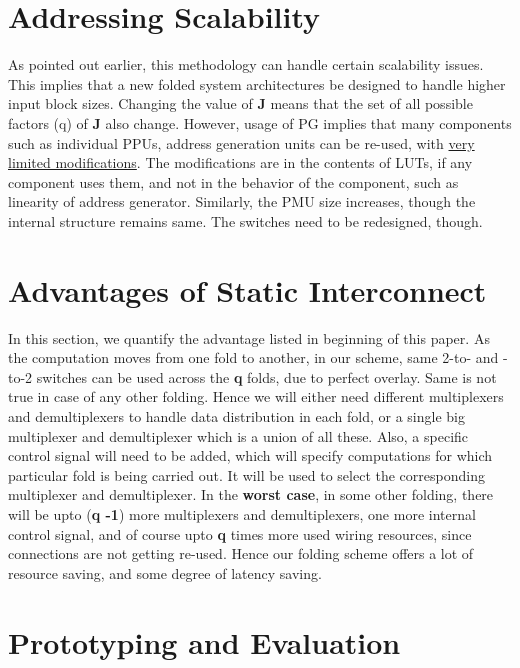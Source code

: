 \documentclass[12pt]{article}
\begin{document}
\section{Addressing Scalability}
\label{scale_sec}
As pointed out earlier, this methodology can handle certain scalability
issues. This implies that a new folded system
architectures be designed to handle higher 
input block sizes. Changing the value of \textbf{J} means that the set of all possible
factors (q) of \textbf{J} also change. However, usage of
PG implies that many components such as
individual PPUs, address generation units can be re-used,
with \uline{very limited modifications}. The modifications are in the
contents of LUTs, if any component uses them, and not in the behavior of
the component, such as linearity of address generator.
Similarly, the PMU size increases, though
the internal structure remains same. The switches need to be redesigned,
though.

\section{Advantages of Static Interconnect}
\label{stat_adv_sec}
In this section, we quantify the  advantage listed in beginning of
this paper. As the computation moves from one fold to another, in our
scheme, same 2-to- and -to-2 switches can be used
across the \textbf{q} folds, due to perfect overlay. Same is not true in
case of any other folding. Hence we will either need different multiplexers
and demultiplexers to handle data distribution in each fold, or a single
big multiplexer and demultiplexer which is a union of all these. Also, a
specific control signal will need to be added, which will specify
computations for which particular fold is being carried out. It will be
used to select the corresponding multiplexer and demultiplexer. In the
\textbf{worst case}, in some other folding, there will be upto (\textbf{q -1})
more multiplexers and demultiplexers, one more internal control signal, and
of course upto \textbf{q} times more used wiring resources, since connections
are not getting re-used. Hence our folding scheme offers a lot of resource
saving, and some degree of latency saving.
\section{Prototyping and Evaluation}
\label{exp_sec}
\end{document}
